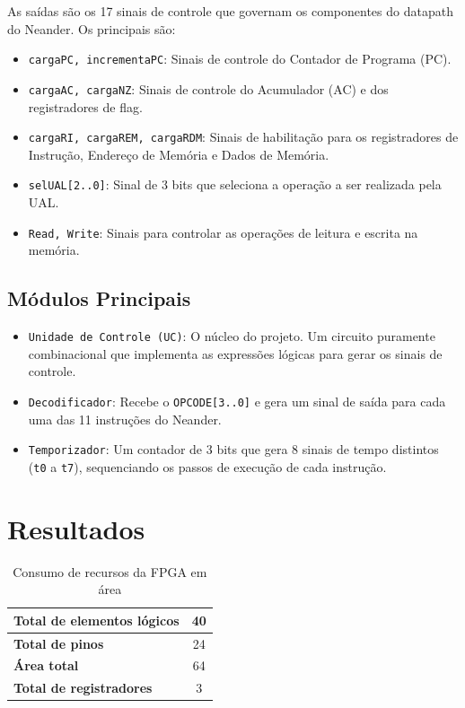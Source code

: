 \documentclass[12pt, fleqn]{article}
\begin{document}
As saídas são os 17 sinais de controle que governam os componentes do datapath do Neander. Os principais são:
\begin{itemize}
	\item \texttt{cargaPC, incrementaPC}: Sinais de controle do Contador de Programa (PC).
	\item \texttt{cargaAC, cargaNZ}: Sinais de controle do Acumulador (AC) e dos registradores de flag.
	\item \texttt{cargaRI, cargaREM, cargaRDM}: Sinais de habilitação para os registradores de Instrução, Endereço de Memória e Dados de Memória.
	\item \texttt{selUAL[2..0]}: Sinal de 3 bits que seleciona a operação a ser realizada pela UAL.
	\item \texttt{Read, Write}: Sinais para controlar as operações de leitura e escrita na memória.
\end{itemize}

\subsection{Módulos Principais}

\begin{itemize}
	\item \texttt{Unidade de Controle (UC)}: O núcleo do projeto. Um circuito puramente combinacional que implementa as expressões lógicas para gerar os sinais de controle.
	\item \texttt{Decodificador}: Recebe o \texttt{OPCODE[3..0]} e gera um sinal de saída para cada uma das 11 instruções do Neander.
	\item \texttt{Temporizador}: Um contador de 3 bits que gera 8 sinais de tempo distintos (\texttt{t0} a \texttt{t7}), sequenciando os passos de execução de cada instrução.
\end{itemize}

\section{Resultados}

\begin{table}[H]
    \centering
    \begin{tabular}{|l | c|}
        \hline
        \textbf{Total de elementos lógicos} & 40 \\
        \hline
        \textbf{Total de pinos} & 24 \\
        \hline
        \textbf{Área total} & 64 \\
        \hline
        \textbf{Total de registradores} & 3 \\
        \hline
    \end{tabular}
    \caption{Consumo de recursos da FPGA em área}
\end{table}
\end{document}
